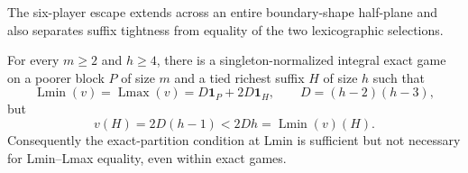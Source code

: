 The six-player escape extends across an entire boundary-shape half-plane and
also separates suffix tightness from equality of the two lexicographic selections.

\begin{theorem}
\label{thm:lx-two-poorer-family}
For every $m\geq2$ and $h\geq4$, there is a singleton-normalized integral
exact game on a poorer block $P$ of size $m$ and a tied richest suffix $H$ of
size $h$ such that
\[
 \operatorname{Lmin}(v)=\operatorname{Lmax}(v)
 =D\mathbf1_P+2D\mathbf1_H,
 \qquad D=(h-2)(h-3),
\]
but
\[
 v(H)=2D(h-1)<2Dh=\operatorname{Lmin}(v)(H).
\]
Consequently the exact-partition condition at Lmin is sufficient but not
necessary for Lmin--Lmax equality, even within exact games.
\end{theorem}

